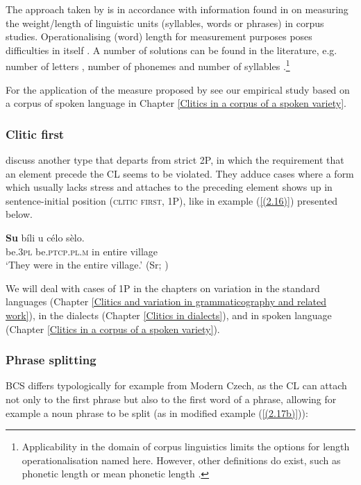 The approach taken by \citet{KCN18} is in accordance with information found in \citet[90--93,  as well as in references therein]{Stefanowitsch20} on measuring the weight/length of linguistic units (syllables, words or phrases) in corpus studies. Operationalising (word) length for measurement purposes poses difficulties in itself \citep[90]{Stefanowitsch20}. A number of solutions can be found in the literature, e.g. number of letters \citep[cf.][]{Wulff03}, number of phonemes \citep[cf.][]{Sobkowiak93} and number of syllables \citep[cf.][]{Sobkowiak93, Stefanowitsch03}.\footnote{Applicability in the domain of corpus linguistics limits the options for length operationalisation named here. However, other definitions do exist, such as phonetic length or mean phonetic length \citep[90f]{Stefanowitsch20}.}

For the application of the measure proposed by \citet{KCN18}  see our empirical study based on a corpus of spoken language in Chapter \ref{Clitics in a corpus of a spoken variety}.


\subsubsection{Clitic first}
\label{Clitic first (1P)}
\citet[225--234]{FranksKing00} discuss another type that departs from strict 2P, in which the requirement that an element precede the CL seems to be violated. They adduce cases where a form which usually lacks stress and attaches to the preceding element shows up in sentence-initial position (\textsc{clitic} \textsc{first}, 1P), like in example (\ref{(2.16)}) presented below.

\begin{exe}\ex\label{(2.16)}
\gll \textbf{Su} bíli u célo  sèlo.\\
 be\textsc{.3pl} be\textsc{.ptcp.pl.m} in entire village\\
\glt ‘They were in the entire village.’ 
\hfill (Sr; \citealt[148]{Okuka08})
\end{exe}

\noindent We will deal with cases of 1P in the chapters on variation in the standard languages (Chapter \ref{Clitics and variation in grammaticography and related work}), in the dialects (Chapter \ref{Clitics in dialects}), and in spoken language (Chapter \ref{Clitics in a corpus of a spoken variety}).

\subsubsection{Phrase splitting}
\label{Phrase splitting (2W)}
BCS differs typologically for example from Modern Czech, as the CL can attach not only to the first phrase but also to the first word of a phrase, allowing for example a noun phrase to be split (as in modified example (\ref{(2.17b)})):

